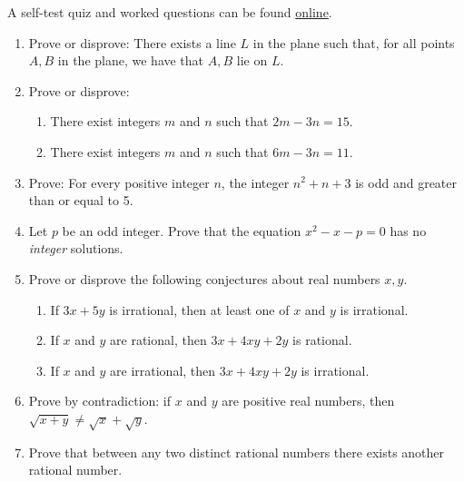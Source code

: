 \begin{exercises}{}{}
	A self-test quiz and worked questions can be found \href{http://www.math.uci.edu/~ndonalds/math13/selftest/2-4-proofs2.html}{online}.

\begin{enumerate}
  \item Prove or disprove: There exists a line $L$ in the plane such that, for all points $A,B$ in the plane, we have that $A,B$ lie on $L$. 
  

	\item Prove or disprove:
	\begin{enumerate}
	  \item There exist integers $m$ and $n$ such that $2m-3n=15$. 
	  
		\item There exist integers $m$ and $n$ such that $6m-3n=11$. 
  \end{enumerate}
   
   
	\item Prove: For every positive integer $n$, the integer $n^2+n+3$ is odd and greater than or equal to 5.
	

	\item Let $p$ be an odd integer. Prove that the equation $x^2-x-p=0$ has no \emph{integer} solutions.
   
   
	\item Prove or disprove the following conjectures about real numbers $x,y$.
	\begin{enumerate}
	  \item If $3x+5y$ is irrational, then at least one of $x$ and $y$ is irrational.
	  
	  \item If $x$ and $y$ are rational, then $3x+4xy+2y$ is rational.
	  
	  \item If $x$ and $y$ are irrational, then $3x+4xy+2y$ is irrational.
	\end{enumerate}
  
  
	\item Prove by contradiction: if $x$ and $y$ are positive real numbers, then $\sqrt{x+y}\neq\sqrt{x}+\sqrt{y}$.
  
  
	\item Prove that between any two distinct rational numbers there exists another rational number.\label{ex:rationalsdenseinthemselves}
	


\end{enumerate}
\end{exercises}
